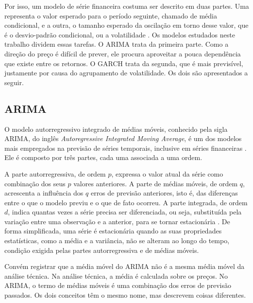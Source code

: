 Por isso, um modelo de série financeira costuma ser descrito em duas partes. Uma
representa o valor esperado para o período seguinte, chamado de média condicional,
e a outra, o tamanho esperado da oscilação em torno desse valor, que é o desvio-padrão
condicional, ou a volatilidade \cite{thomaz2019}. Os modelos estudados neste
trabalho dividem essas tarefas. O ARIMA trata da primeira parte. Como a direção do
preço é difícil de prever, ele procura aproveitar a pouca dependência que existe
entre os retornos. O GARCH trata da segunda, que é mais previsível, justamente por
causa do agrupamento de volatilidade. Os dois são apresentados a seguir.

\subsection{ARIMA}

O modelo autorregressivo integrado de médias móveis, conhecido pela sigla ARIMA,
do inglês \textit{Autoregressive Integrated Moving Average}, é um dos modelos mais
empregados na previsão de séries temporais, inclusive em séries financeiras
\cite{xing2024}. Ele é composto por três partes, cada uma associada a uma ordem.

A parte autorregressiva, de ordem $p$, expressa o valor atual da série como
combinação dos seus $p$ valores anteriores. A parte de médias móveis, de ordem
$q$, acrescenta a influência dos $q$ erros de previsão anteriores, isto é, das
diferenças entre o que o modelo previu e o que de fato ocorreu. A parte integrada,
de ordem $d$, indica quantas vezes a série precisa ser diferenciada, ou seja,
substituída pela variação entre uma observação e a anterior, para se tornar
estacionária \cite{xing2024}. De forma simplificada, uma série é estacionária quando
as suas propriedades estatísticas, como a média e a variância, não se alteram ao
longo do tempo, condição exigida pelas partes autorregressiva e de médias móveis.

Convém registrar que a média móvel do ARIMA não é a mesma média móvel da análise
técnica. Na análise técnica, a média é calculada sobre os preços. No ARIMA, o
termo de médias móveis é uma combinação dos erros de previsão passados. Os dois
conceitos têm o mesmo nome, mas descrevem coisas diferentes.

